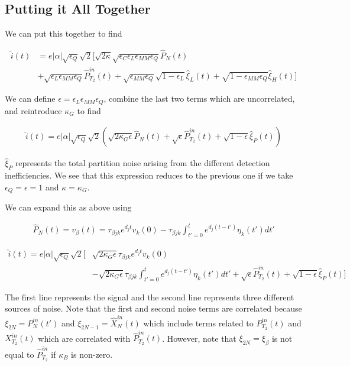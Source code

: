 \documentclass[12pt]{article}
\begin{document}
\subsection{Putting it All Together}

We can put this together to find

\begin{align}
\hat{i}(t) &= e|\alpha|\sqrt{\epsilon_Q} \sqrt{2}\Big[\sqrt{2\kappa}\sqrt{\epsilon_C\epsilon_L\epsilon_{MM}\epsilon_Q}\hat{P}_N(t)\\
&+ \sqrt{\epsilon_L\epsilon_{MM}\epsilon_Q}\hat{P}_{T_2}^{in}(t) + \sqrt{\epsilon_{MM}\epsilon_Q}\sqrt{1-\epsilon_L}\hat{\xi}_L(t) + \sqrt{1-\epsilon_{MM}\epsilon_Q}\hat{\xi}_H(t) \Big]
\end{align}

We can define $\epsilon = \epsilon_L \epsilon_{MM} \epsilon_Q$, combine the last two terms which are uncorrelated, and reintroduce $\kappa_G$ to find

\begin{align}
\hat{i}(t) = e|\alpha|\sqrt{\epsilon_Q}\sqrt{2}\left(\sqrt{2\kappa_G \epsilon} \hat{P}_N(t) + \sqrt{\epsilon}\hat{P}_{T_2}^{in}(t) + \sqrt{1-\epsilon}\hat{\xi}_P(t) \right)
\end{align}

$\hat{\xi}_P$ represents the total partition noise arising from the different detection inefficiencies.
We see that this expression reduces to the previous one if we take $\epsilon_Q = \epsilon = 1$ and $\kappa = \kappa_G$.

We can expand this as above using

\begin{align}
\hat{P}_N(t) = v_{\beta}(t) = \tau_{\beta j k} e^{d_j t} v_k(0) - \tau_{\beta jk} \int_{t'=0}^{t} e^{d_j(t-t')}\eta_k(t') dt'
\end{align}

\begin{align}
\hat{i}(t) = e|\alpha| \sqrt{\epsilon_Q}\sqrt{2}\Bigg[&\sqrt{2\kappa_G \epsilon} \tau_{\beta j k}e^{d_j t}v_k(0)\\
& - \sqrt{2\kappa_G \epsilon} \tau_{\beta jk} \int_{t'=0}^{t}e^{d_j(t-t')}\eta_k(t') dt' + \sqrt{\epsilon}\hat{P}_{T_2}^{in}(t) + \sqrt{1-\epsilon}\hat{\xi}_P(t) \Bigg]
\end{align}

The first line represents the signal and the second line represents three different sources of noise. Note that the first and second noise terms are correlated because $\xi_{2N} = P_{N}^{in}(t')$ and $\xi_{2N-1} = \hat{X}_N^{in}(t)$ which include terms related to $P_{T_2}^{in}(t)$ and $X_{T_2}^{in}(t)$ which are correlated with $\hat{P}_{T_2}^{in}(t)$. However, note that $\xi_{2N} = \xi_{\beta}$ is not equal to $\hat{P}_{T_2}^{in}$ if $\kappa_B$ is non-zero.
\end{document}
